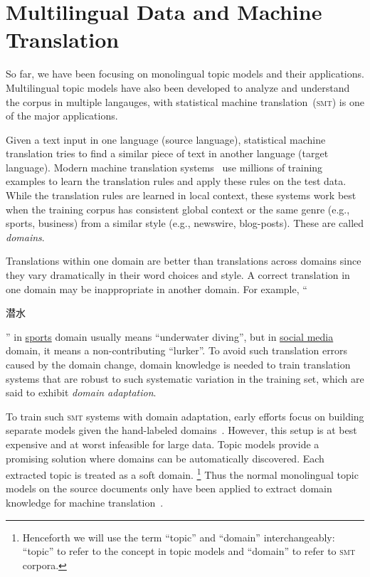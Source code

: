 \chapter{Multilingual Data and Machine Translation}
\label{ch:mt}


So far, we have been focusing on monolingual topic models and their
applications. Multilingual topic models have also been
developed to analyze and understand the corpus in multiple langauges,
with statistical machine translation~(\textsc{smt}) is one of the major
applications.

Given a text input in one language (source language), statistical
machine translation tries to find a similar piece of text in another
language (target language). Modern machine translation
systems~\citep{koehn-09} use millions of training examples to learn
the translation rules and apply these rules on the test data. While
the translation rules are learned in local context, these systems work
best when the training corpus has consistent global context or the
same genre (e.g., sports, business) from a similar style (e.g.,
newswire, blog-posts).  These are called \emph{domains}.

Translations within one domain are better than translations across
domains since they vary dramatically in their word choices and style.
A correct translation in one domain may be inappropriate in another
domain.  For example, ``\begin{CJK*}{UTF8}{gbsn}潜水\end{CJK*}'' in
  \underline{sports} domain usually means ``underwater diving'', but
  in \underline{social media} domain, it means a non-contributing
  ``lurker''. To avoid such translation errors caused by the domain
  change, domain knowledge is needed to train translation systems that
  are robust to such systematic variation in the training set, which
  are said to exhibit \emph{domain adaptation}.

To train such \textsc{smt} systems with domain adaptation, early
efforts focus on building separate models given the hand-labeled
domains~\citep{foster-07,matsoukas-09,chiang-11}. However, this setup
is at best expensive and at worst infeasible for large data.  Topic
models provide a promising solution where domains can be automatically
discovered. Each extracted topic is treated as a soft
domain. \footnote{Henceforth we will use the term ``topic'' and
  ``domain'' interchangeably: ``topic'' to refer to the concept in
  topic models and ``domain'' to refer to \textsc{smt} corpora.} Thus
the normal monolingual topic models on the source documents only have
been applied to extract domain knowledge for machine
translation~\citep{Eidelman-12}.

